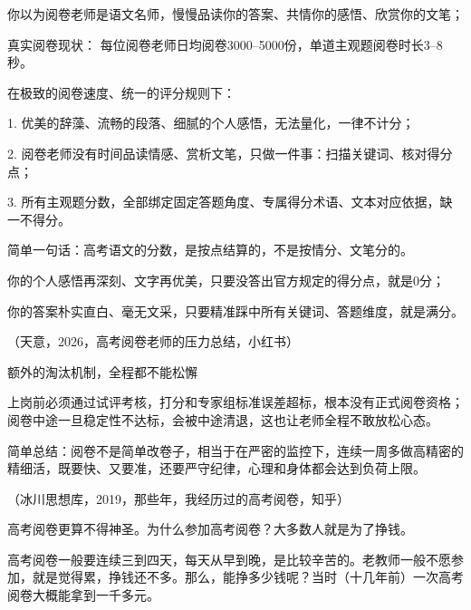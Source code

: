 \documentclass[12pt,a4paper]{article}
\begin{document}
你以为阅卷老师是语文名师，慢慢品读你的答案、共情你的感悟、欣赏你的文笔；



真实阅卷现状： 每位阅卷老师日均阅卷3000–5000份，单道主观题阅卷时长3–8秒。





在极致的阅卷速度、统一的评分规则下：





1. 优美的辞藻、流畅的段落、细腻的个人感悟，无法量化，一律不计分；



2. 阅卷老师没有时间品读情感、赏析文笔，只做一件事：扫描关键词、核对得分点；



3. 所有主观题分数，全部绑定固定答题角度、专属得分术语、文本对应依据，缺一不得分。





简单一句话：高考语文的分数，是按点结算的，不是按情分、文笔分的。





你的个人感悟再深刻、文字再优美，只要没答出官方规定的得分点，就是0分；



你的答案朴实直白、毫无文采，只要精准踩中所有关键词、答题维度，就是满分。



{\color{gray}\small （天意，2026，高考阅卷老师的压力总结，小红书）}



额外的淘汰机制，全程都不能松懈

上岗前必须通过试评考核，打分和专家组标准误差超标，根本没有正式阅卷资格；阅卷中途一旦稳定性不达标，会被中途清退，这也让老师全程不敢放松心态。

简单总结：阅卷不是简单改卷子，相当于在严密的监控下，连续一周多做高精密的精细活，既要快、又要准，还要严守纪律，心理和身体都会达到负荷上限。



{\color{gray}\small （冰川思想库，2019，那些年，我经历过的高考阅卷，知乎）}



高考阅卷更算不得神圣。为什么参加高考阅卷？大多数人就是为了挣钱。





高考阅卷一般要连续三到四天，每天从早到晚，是比较辛苦的。老教师一般不愿参加，就是觉得累，挣钱还不多。那么，能挣多少钱呢？当时（十几年前）一次高考阅卷大概能拿到一千多元。
\end{document}
